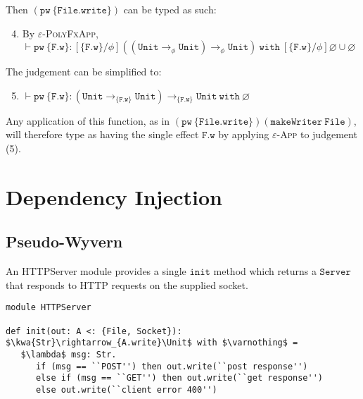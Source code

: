 \documentclass{llncs}
\newcommand{\keywadj}[1]{\mathtt{#1}}
\newcommand{\keyw}[1]{\keywadj{#1}~}
\newcommand{\kw}[1]{\keyw{ #1 }}
\newcommand{\kwa}[1]{\keywadj{ #1 }}
\newcommand{\Unit}[0]{ \kwa{Unit} }
\begin{document}
\noindent
Then $\kwa{(pw~\{ File.write \})}$ can be typed as such:

\begin{enumerate}
  \setcounter{enumi}{3}
  \item By \textsc{$\varepsilon$-PolyFxApp}, \\ $\vdash \kwa{pw~\{ F.w \}}: [\{ \kwa{F.w} \}/\phi]( (\Unit \rightarrow_{\phi} \Unit) \rightarrow_{\phi} \Unit) ~\kw{with} [\{ \kwa{F.w} \}/\phi]\varnothing \cup \varnothing$
\end{enumerate}

\noindent
The judgement can be simplified to:

\begin{enumerate}
	\setcounter{enumi}{4}
	\item $\vdash \kwa{pw~\{ F.w \}}: (\Unit \rightarrow_{\{\kwa{F.w}\}} \Unit) \rightarrow_{\{\kwa{F.w}\}} \Unit ~\kw{with} \varnothing$
\end{enumerate}

\noindent
Any application of this function, as in $\kwa{(pw~\{File.write\}) (makeWriter~ File)}$, will therefore type as having the single effect $\kwa{F.w}$ by applying \textsc{$\varepsilon$-App} to judgement (5).




























\section{Dependency Injection}

\subsection*{Pseudo-Wyvern}

An HTTPServer module provides a single $\kwa{init}$ method which returns a $\kwa{Server}$ that responds to HTTP requests on the supplied socket.
\begin{lstlisting}
module HTTPServer

def init(out: A <: {File, Socket}): $\kwa{Str}\rightarrow_{A.write}\Unit$ with $\varnothing$ =
   $\lambda$ msg: Str.
      if (msg == ``POST'') then out.write(``post response'')
      else if (msg == ``GET'') then out.write(``get response'')
      else out.write(``client error 400'')
\end{lstlisting}
\end{document}
